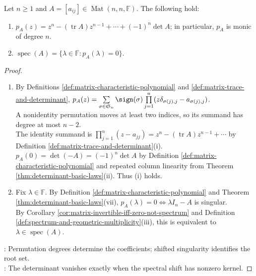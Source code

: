 \begin{theorem} \label{thm:matrix-characteristic-polynomial-basic-coefficients} \\
Let $n\geq1$ and $A=[a_{ij}]\in\operatorname{Mat}(n,n,\mathbb{F})$. The following hold:
\begin{enumerate}[label=(\roman*)]
\setlength{\itemsep}{0pt}
\item $p_A(z)=z^n-(\operatorname{tr}A)z^{n-1}+\cdots+(-1)^n\det A$; in particular, $p_A$ is monic of degree $n$.
\item $\operatorname{spec}(A)=\{\lambda\in\mathbb{F}:p_A(\lambda)=0\}$.
\end{enumerate}
\begin{proof}
\begin{enumerate}[label=(\roman*)]
\setlength{\itemsep}{0pt}
\item By Definitions \ref{def:matrix-characteristic-polynomial} and \ref{def:matrix-trace-and-determinant}, $p_A(z)=\sum\limits_{\sigma\in\mathfrak{S}_n}\sign(\sigma)\prod\limits_{j=1}^{n}(z\delta_{\sigma(j),j}-a_{\sigma(j),j})$.\\
A nonidentity permutation moves at least two indices, so its summand has degree at most $n-2$.\\
The identity summand is $\prod\limits_{j=1}^{n}(z-a_{jj})=z^n-(\operatorname{tr}A)z^{n-1}+\cdots$ by Definition \ref{def:matrix-trace-and-determinant}(i).\\
$p_A(0)=\det(-A)=(-1)^n\det A$ by Definition \ref{def:matrix-characteristic-polynomial} and repeated column linearity from Theorem \ref{thm:determinant-basic-laws}(ii). Thus (i) holds.
\item Fix $\lambda\in\mathbb{F}$. By Definition \ref{def:matrix-characteristic-polynomial} and Theorem \ref{thm:determinant-basic-laws}(vii), $p_A(\lambda)=0\Longleftrightarrow\lambda I_n-A$ is singular.\\
By Corollary \ref{cor:matrix-invertible-iff-zero-not-spectrum} and Definition \ref{def:spectrum-and-geometric-multiplicity}(iii), this is equivalent to $\lambda\in\operatorname{spec}(A)$.
\end{enumerate}
: Permutation degrees determine the coefficients; shifted singularity identifies the root set.\\
: The determinant vanishes exactly when the spectral shift has nonzero kernel.
\end{proof}
\end{theorem}

